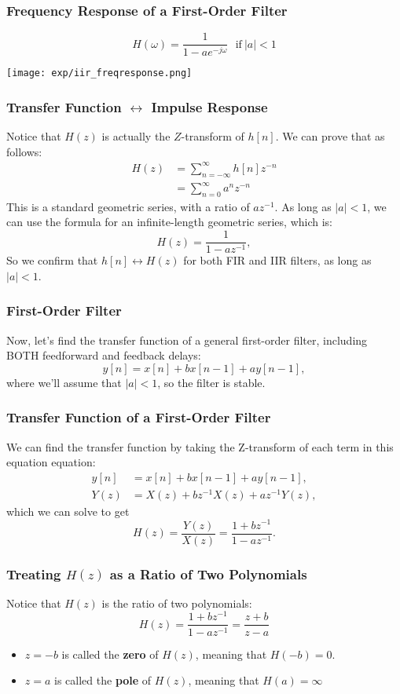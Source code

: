 \documentclass{beamer}
\begin{document}
\begin{frame}
  \frametitle{Frequency Response of a  First-Order Filter}
  \[
  H(\omega) = \frac{1}{1-ae^{-j\omega}}~~~\mbox{if}~|a|<1
  \]
  
  \centerline{\texttt{[image: exp/iir\_freqresponse.png]}}
\end{frame}

\begin{frame}
  \frametitle{Transfer Function $\leftrightarrow$ Impulse Response}

  Notice that $H(z)$ is actually the $Z$-transform of $h[n]$.  We can
  prove that as follows:
  \begin{align*}
    H(z) &= \sum_{n=-\infty}^\infty h[n] z^{-n}\\
    &= \sum_{n=0}^\infty a^n z^{-n} 
  \end{align*}
  This is a standard geometric series, with a ratio of $az^{-1}$.  As
  long as $|a|<1$, we can use the formula for an infinite-length
  geometric series, which is:
  \[
  H(z) = \frac{1}{1-az^{-1}},
  \]
  So we confirm that $h[n]\leftrightarrow H(z)$ for both FIR and IIR
  filters, as long as $|a|<1$.
\end{frame}

\begin{frame}
  \frametitle{First-Order Filter}

  Now, let's find the transfer function of a general first-order filter, including BOTH
  feedforward and feedback delays:
  \[
  y[n] = x[n] + bx[n-1] + ay[n-1],
  \]
  where we'll assume that $|a|<1$, so the filter is stable.  
\end{frame}

\begin{frame}
  \frametitle{Transfer Function of a First-Order Filter}

  We can find the transfer function by taking the Z-transform of each
  term in this equation equation:
  \begin{align*}
    y[n] &= x[n] + bx[n-1] + ay[n-1],\\
    Y(z) &= X(z)+bz^{-1}X(z)+az^{-1} Y(z),
  \end{align*}
  which we can solve to get
  \[
  H(z)  = \frac{Y(z)}{X(z)} = \frac{1+bz^{-1}}{1-az^{-1}}.
  \]
\end{frame}

\begin{frame}
  \frametitle{Treating $H(z)$ as a Ratio of Two Polynomials}

  Notice that $H(z)$ is the ratio of two polynomials:
  \[
  H(z)=\frac{1+bz^{-1}}{1-az^{-1}}=\frac{z+b}{z-a}
  \]
  \begin{itemize}
  \item $z=-b$ is called the {\bf zero} of $H(z)$, meaning that $H(-b)=0$.
  \item $z=a$ is called the {\bf pole} of $H(z)$, meaning that $H(a)=\infty$
  \end{itemize}
\end{frame}
\end{document}
